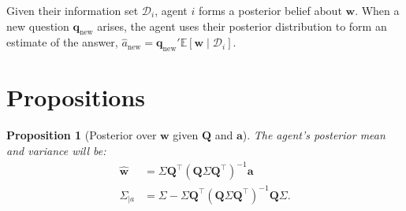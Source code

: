 \documentclass[\ifdraft draft\fi]{article}
\newtheorem{proposition}{Proposition}
\begin{document}
Given their information set $\mathcal{D}_i$, agent $i$ forms a posterior belief about $\bm{w}$. When a new question $\bm{q}_{\text{new}}$ arises, the agent uses their posterior distribution to form an estimate of the answer, $\hat{a}_{\text{new}} = \bm{q}_{\text{new}}' \mathbb{E}[\bm{w} \mid \mathcal{D}_i]$.

\section{Propositions}

\begin{proposition}[Posterior over $\bm{w}$ given $\bm{Q}$ and $\bm{a}$]
The agent's posterior mean and variance will be:
   \[\begin{aligned}
      \hat{\bm w}&= \Sigma \bm{Q}^{\top}(\bm{Q}\Sigma \bm{Q}^{\top})^{-1}\bm a\\
      \Sigma_{\mid a} &=\Sigma-\Sigma \bm{Q}^{\top}(\bm{Q}\Sigma \bm{Q}^{\top})^{-1}\bm{Q}\Sigma.
   \end{aligned}
   \]
\end{proposition}
\end{document}
